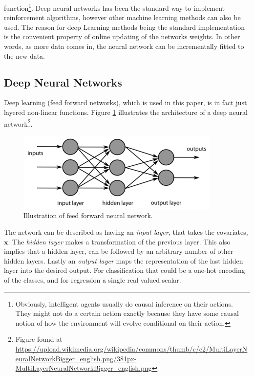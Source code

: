 function\footnote{Obviously, intelligent agents usually do causal inference on their actions. They might not do a certain action exactly because they have some causal notion of how the environment will evolve conditional on their action.}. Deep neural networks has been the standard way to implement reinforcement algorithms, however other machine learning methods can also be used. The reason for deep Learning methods being the standard implementation is the convenient property of online updating of the networks weights. In other words, as more data comes in, the neural network can be incrementally fitted to the new data.

\subsection{Deep Neural Networks}

Deep learning (feed forward networks), which is used in this paper, is in fact just layered non-linear functions. Figure \ref{fig:feedforwardnetwork} illustrates the architecture of a deep neural network\footnote{Figure found at \url{https://upload.wikimedia.org/wikipedia/commons/thumb/c/c2/MultiLayerNeuralNetworkBigger_english.png/381px-MultiLayerNeuralNetworkBigger_english.png}}.

\begin{figure}[ht]
    \centering
    \includegraphics[scale=0.6]{figures/feedforwardnetworkillustration.png}
    \caption{Illustration of feed forward neural network. }
    \label{fig:feedforwardnetwork}
\end{figure}

The network can be described as having an \textit{input layer}, that takes the covariates, $\textbf{x}$. The \textit{hidden layer} makes a transformation of the previous layer. This also implies that a hidden layer, can be followed by an arbitrary number of other hidden layers. Lastly an \textit{output layer} maps the representation of the last hidden layer into the desired output. For classification that could be a one-hot encoding of the classes, and for regression a single real valued scalar.

